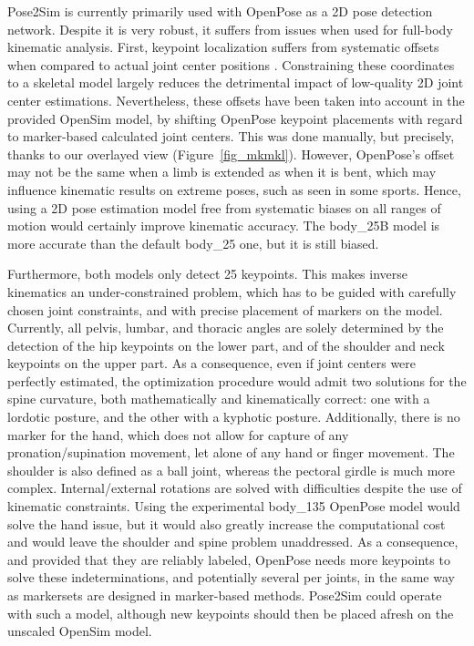 Pose2Sim is currently primarily used with OpenPose as a 2D pose detection network. Despite it is very robust, it suffers from issues when used for full-body kinematic analysis. First, keypoint localization suffers from systematic offsets when compared to actual joint center positions \cite{Needham2021b}. Constraining these coordinates to a skeletal model largely reduces the detrimental impact of low-quality 2D joint center estimations. Nevertheless, these offsets have been taken into account in the provided OpenSim model, by shifting OpenPose keypoint placements with regard to marker-based calculated joint centers. This was done manually, but precisely, thanks to our overlayed view (Figure~\ref{fig_mkmkl}). However, OpenPose’s offset may not be the same when a limb is extended as when it is bent, which may influence kinematic results on extreme poses, such as seen in some sports. Hence, using a 2D pose estimation model free from systematic biases on all ranges of motion would certainly improve kinematic accuracy. The body\_25B model is more accurate than the default body\_25 one, but it is still biased. 

Furthermore, both models only detect 25 keypoints. This makes inverse kinematics an under-constrained problem, which has to be guided with carefully chosen joint constraints, and with precise placement of markers on the model. Currently, all pelvis, lumbar, and thoracic angles are solely determined by the detection of the hip keypoints on the lower part, and of the shoulder and neck keypoints on the upper part. As a consequence, even if joint centers were perfectly estimated, the optimization procedure would admit two solutions for the spine curvature, both mathematically and kinematically correct: one with a lordotic posture, and the other with a kyphotic posture. Additionally, there is no marker for the hand, which does not allow for capture of any pronation/supination movement, let alone of any hand or finger movement. The shoulder is also defined as a ball joint, whereas the pectoral girdle is much more complex. Internal/external rotations are solved with difficulties despite the use of kinematic constraints. Using the experimental body\_135 OpenPose model would solve the hand issue, but it would also greatly increase the computational cost and would leave the shoulder and spine problem unaddressed. As a consequence, and provided that they are reliably labeled, OpenPose needs more keypoints to solve these indeterminations, and potentially several per joints, in the same way as markersets are designed in marker-based methods. Pose2Sim could operate with such a model, although new keypoints should then be placed afresh on the unscaled OpenSim model. 

